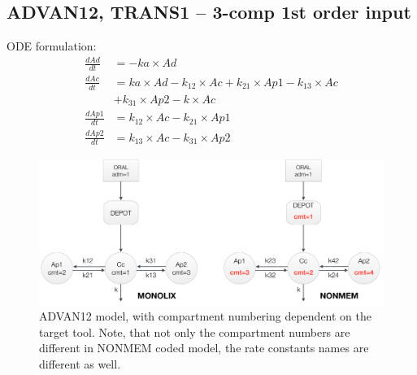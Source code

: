 \subsection{ADVAN12, TRANS1 -- 3-comp 1st order input}
\label{subsubsec:ADVAN12}
ODE formulation:
\begin{align}
\frac{dAd}{dt} & =  -ka \times Ad \nonumber \\
\frac{dAc}{dt} & = ka \times Ad - k_{12} \times Ac + k_{21} \times Ap1 - k_{13} \times Ac \nonumber \\
			& + k_{31} \times Ap2 - k \times Ac  \nonumber \\
\frac{dAp1}{dt} & =  k_{12} \times Ac - k_{21} \times Ap1  \nonumber \\
\frac{dAp2}{dt} & =  k_{13} \times Ac - k_{31} \times Ap2  \nonumber
\end{align}

\begin{figure}[htbp!]
\centering
 \includegraphics[width=160mm]{pics/Advan12}
\caption{ADVAN12 model, with compartment numbering dependent on the target tool. 
Note, that not only the compartment numbers are different in NONMEM coded model, 
the rate constants names are different as well.}
\label{fig:Advan12}
\end{figure}


